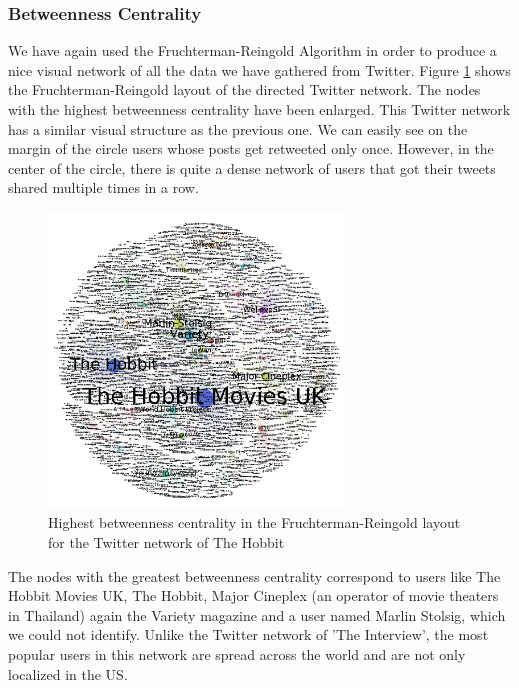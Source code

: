 \documentclass{llncs}
\begin{document}
\subsubsection{Betweenness Centrality}
We have again used the Fruchterman-Reingold Algorithm in order to produce a nice
visual network of all the data we have gathered from Twitter. Figure
\ref{fig:hobbit-twitter-betweennes-centrality} shows the Fruchterman-Reingold
layout of the directed Twitter network. The nodes with the highest betweenness
centrality have been enlarged. This Twitter network has a similar visual
structure as the previous one. We can easily see on the margin of the circle
users whose posts get retweeted only once. However, in the center of the circle,
there is quite a dense network of users that got their tweets shared multiple
times in a row.
%
\begin{figure}
\centering
\includegraphics[width=0.7\textwidth]{hobbit-twitter-betweennes-centrality.png}
\caption{Highest betweenness centrality in the Fruchterman-Reingold layout for
the Twitter network of The Hobbit
\label{fig:hobbit-twitter-betweennes-centrality}}
\end{figure}
%
The nodes with the greatest betweenness centrality correspond to users like The
Hobbit Movies UK, The Hobbit, Major Cineplex (an operator of movie theaters in
Thailand) again the Variety magazine and a user named Marlin Stolsig, which we
could not identify. Unlike the Twitter network of 'The Interview', the most
popular users in this network are spread across the world and are not only
localized in the US.
%
\end{document}
